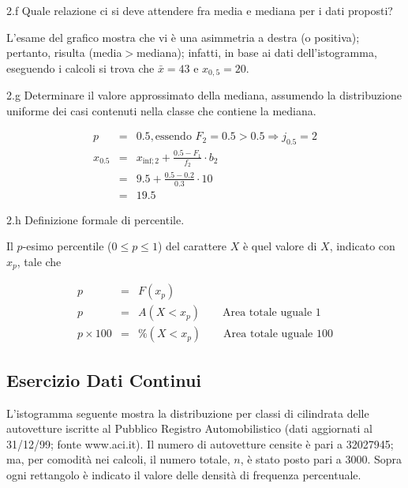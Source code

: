 \documentclass[
  11pt,
]{book}
\theoremstyle{mytheoremstyle}
\theoremstyle{mydefstyle}
\newenvironment{sol}
  {
  \begin{tcolorbox}[enhanced,breakable,arc=0.1mm,boxrule=1pt,colback=white,colframe=iblue,
  title=\bf \fontfamily{lmss}\selectfont \hspace{.5 cm} Soluzione,drop fuzzy shadow]

}{
\end{tcolorbox}
  }
\begin{document}
2.f Quale relazione ci si deve attendere
fra media e mediana per i dati proposti?

\begin{sol}
L'esame del grafico mostra che vi è una asimmetria a destra
(o positiva); pertanto, risulta (media\(>\)mediana); infatti, in
base ai dati dell'istogramma, eseguendo i calcoli si trova che
\(\bar{x}=43\) e \(x_{0,5}=20\).

\end{sol}

2.g Determinare il valore approssimato della mediana,
assumendo la distribuzione uniforme dei casi contenuti nella classe
che contiene la mediana.

\begin{sol}
\begin{eqnarray*}
  p &=&  0.5 , \text{essendo }F_{ 2 }= 0.5  > 0.5  \Rightarrow j_{ 0.5 }= 2 \\
  x_{ 0.5 } &=& x_{\text{inf}; 2 } + \frac{ { 0.5 } - F_{ 1 }} {f_{ 2 }} \cdot b_{ 2 } \\
            &=&  9.5  + \frac {{ 0.5 } -  0.2 } { 0.3 } \cdot  10  \\
            &=&  19.5 
\end{eqnarray*}

\end{sol}

2.h Definizione formale di percentile.

\begin{sol}
Il \(p\)-esimo percentile (\(0 \le p\le 1\)) del carattere \(X\)
è quel valore di \(X\), indicato con \(x_{p}\), tale che

\begin{eqnarray*}
p       &=& F(x_{p}) \\
p       &=& A(X < x_{p})      \qquad \mbox{Area\ totale\ uguale\ 1} \\
p \times 100 &=& \%(X < x_{p}) \qquad \mbox{Area\ totale\ uguale\ 100} 
\end{eqnarray*}

\end{sol}

\subsection{Esercizio Dati Continui}\label{esercizio-dati-continui}

L'istogramma seguente mostra la distribuzione per
classi di cilindrata delle autovetture iscritte al Pubblico
Registro Automobilistico (dati aggiornati al 31/12/99;
fonte www.aci.it).
Il numero di autovetture censite è pari a 32027945; ma,
per comodità nei calcoli, il numero totale, \(n\), è stato
posto pari a 3000.
Sopra ogni rettangolo è indicato il valore delle
densità di frequenza percentuale.
\end{document}
